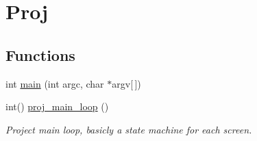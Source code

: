 \hypertarget{group__Proj}{}\section{Proj}
\label{group__Proj}
\subsection*{Functions}
\begin{DoxyCompactItemize}
\item 
int \hyperlink{group__Proj_ga0ddf1224851353fc92bfbff6f499fa97}{main} (int argc, char $\ast$argv\mbox{[}$\,$\mbox{]})
\item 
int() \hyperlink{group__Proj_ga33bde23e0d2bbde847401c5ac6fb62e0}{proj\+\_\+main\+\_\+loop} ()
\begin{DoxyCompactList}\small\item\em Project main loop, basicly a state machine for each screen. \end{DoxyCompactList}\end{DoxyCompactItemize}
